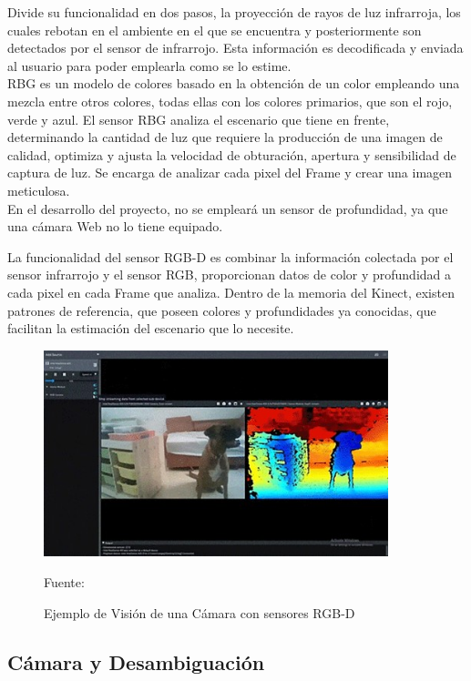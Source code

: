 Divide su funcionalidad en dos pasos, la proyección de rayos de luz infrarroja, los cuales rebotan en el ambiente en el que se encuentra y posteriormente son detectados por el sensor de infrarrojo. Esta información es decodificada y enviada al usuario para poder emplearla como se lo estime.
\\
RBG es un modelo de colores basado en la obtención de un color empleando una mezcla entre otros colores, todas ellas con los colores primarios, que son el rojo, verde y azul. 
El sensor RBG analiza el escenario que tiene en frente, determinando la cantidad de luz que requiere la producción de una imagen de calidad, optimiza y ajusta la velocidad de obturación, apertura y sensibilidad de captura de luz. 
Se encarga de analizar cada pixel del Frame y crear una imagen meticulosa.
\\
En el desarrollo del proyecto, no se empleará un sensor de profundidad, ya que una cámara Web no lo tiene equipado.

La funcionalidad del sensor RGB-D es combinar la información colectada por el sensor infrarrojo y el sensor RGB, proporcionan datos de color y profundidad a cada pixel en cada Frame que analiza. Dentro de la memoria del Kinect, existen patrones de referencia, que poseen colores y profundidades ya conocidas, que facilitan la estimación del escenario que lo necesite\cite{litomisky2012consumer}.  
\begin{figure}[t!]
	\centering
	\includegraphics[width=10cm,height=6cm,]{./Images/RGBandDepth.jpg}
	\caption{Ejemplo de Visión de una Cámara con sensores RGB-D}
	\footnotesize Fuente: \cite{RGBandDepth}
	\label{RGBandDepth}
\end{figure}

\subsection{Cámara y Desambiguación}

